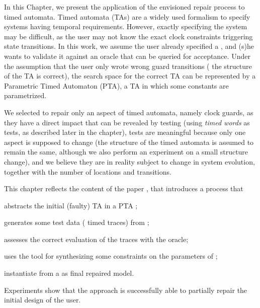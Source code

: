 \begin{tikzborder}{\cite{Gargantini16:validation}}
\begin{tikzborder}{\cite{gargantini_combinatorial_2017}}
\begin{tikzborder}{\cite{garn2019}}
\begin{tikzborder}{\cite{arcaini2019achieving}}
\begin{tikzborder}{\cite{arcaini2019varivolution}}
In this Chapter, we present the application of the envisioned repair process to timed automata.
Timed automata (TAs) \cite{AD94} are a widely used formalism to specify systems having temporal requirements. However, exactly specifying the system may be difficult, as the user may not know the exact clock constraints triggering state transitions. In this work, we assume the user already specified a \ta, and (s)he wants to validate it against an oracle that can be queried for acceptance. Under the assumption that the user only wrote wrong guard transitions (\ie{} the structure of the TA is correct), the search space for the correct TA can be represented by a Parametric Timed Automaton (PTA), \ie{} a TA in which some constants are parametrized.

We selected to repair only an aspect of timed automata, namely clock guards, as they have a direct impact that can be revealed by testing (using \textit{timed words} as tests, as described later in the chapter), tests are meaningful because only one aspect is supposed to change (the structure of the timed automata is assumed to remain the same, although we also perform an experiment on a small structure change), and we believe they are in reality subject to change in system evolution, together with the number of locations and transitions.

This chapter reflects the content of the paper \cite{andre_tap_2019}, that introduces a process that
%
\begin{inparaenum}[(i)]
	\item abstracts the initial (faulty) TA \initTa in a PTA \ptaProc;
	\item generates some test data (\ie{} timed traces) from \ptaProc;
	\item assesses the correct evaluation of the traces with the oracle;
	\item uses the \imitator tool for synthesizing some constraints \ptaConstr on the parameters of \ptaProc;
	\item instantiate from \ptaConstr a \ta \repTa as final repaired model.
\end{inparaenum}
%
Experiments show that the approach is successfully able to partially repair the initial design of the user.



\end{tikzborder}
\end{tikzborder}
\end{tikzborder}
\end{tikzborder}
\end{tikzborder}
